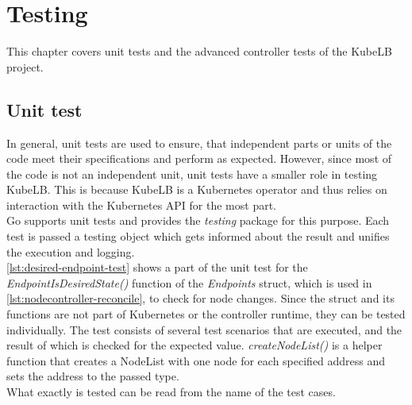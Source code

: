 \chapter{Testing}

This chapter covers unit tests and the advanced controller tests of the KubeLB project.

\section{Unit test}\label{sec:unit-test}
In general, unit tests are used to ensure, that independent parts or units of the code meet their specifications and perform as expected.
However, since most of the code is not an independent unit, unit tests have a smaller role in testing KubeLB.
This is because KubeLB is a Kubernetes operator and thus relies on interaction with the Kubernetes API for the most part.
\\
Go supports unit tests and provides the \textit{testing} package for this purpose.
Each test is passed a testing object which gets informed about the result and unifies the execution and logging.
\\
\autoref{lst:desired-endpoint-test} shows a part of the unit test for the \textit{EndpointIsDesiredState()} function of the \textit{Endpoints} struct, which is used in \autoref{lst:nodecontroller-reconcile}, to check for node changes.
Since the struct and its functions are not part of Kubernetes or the controller runtime, they can be tested individually.
The test consists of several test scenarios that are executed, and the result of which is checked for the expected value.
\textit{createNodeList()} is a helper function that creates a NodeList with one node for each specified address and sets the address to the passed type.
\\
What exactly is tested can be read from the name of the test cases.

